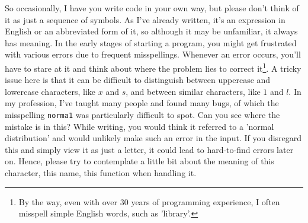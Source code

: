 \documentclass{ltjsbook}
\begin{document}
So occasionally, I have you write code in your own way, but please don't think of it as just a sequence of symbols. As I've already written, it's an expression in English or an abbreviated form of it, so although it may be unfamiliar, it always has meaning.
In the early stages of starting a program, you might get frustrated with various errors due to frequent misspellings. Whenever an error occurs, you'll have to stare at it and think about where the problem lies to correct it\footnote{By the way, even with over 30 years of programming experience, I often misspell simple English words, such as 'library'.}. A tricky issue here is that it can be difficult to distinguish between uppercase and lowercase characters, like $x$ and $s$, and between similar characters, like $1$ and $l$.
In my profession, I've taught many people and found many bugs, of which the misspelling \texttt{norma1} was particularly difficult to spot. Can you see where the mistake is in this? While writing, you would think it referred to a 'normal distribution' and would unlikely make such an error in the input. If you disregard this and simply view it as just a letter, it could lead to hard-to-find errors later on. Hence, please try to contemplate a little bit about the meaning of this character, this name, this function when handling it.

\end{document}

